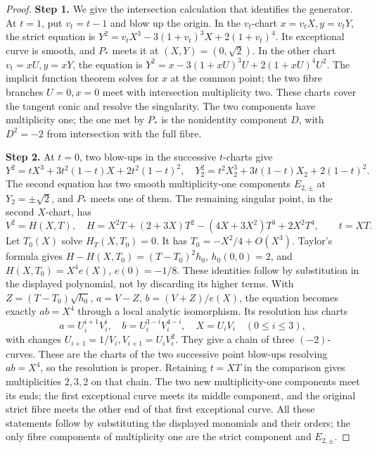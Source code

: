\begin{proof}
\par\smallskip\noindent\textbf{Step 1.} We give the intersection calculation that identifies the generator. At $t=1$, put $v_t=t-1$ and blow up the origin. In the $v_t$-chart $x=v_t X,y=v_t Y$, the strict equation is
$Y^2=v_t X^3-3(1+v_t)^3X+2(1+v_t)^4$. Its exceptional curve is smooth, and $P_*$ meets it at $(X,Y)=(0,\sqrt2)$. In the other chart $v_t=xU,y=xY$, the equation is $Y^2=x-3(1+xU)^3U+2(1+xU)^4U^2$. The implicit function theorem solves for $x$ at the common point; the two fibre branches $U=0,x=0$ meet with intersection multiplicity two. These charts cover the tangent conic and resolve the singularity. The two components have multiplicity one; the one met by $P_*$ is the nonidentity component $D$, with $D^2=-2$ from intersection with the full fibre.

\par\smallskip\noindent\textbf{Step 2.} At $t=0$, two blow-ups in the successive $t$-charts give
\[
 Y^2=tX^3+3t^2(1-t)X+2t^2(1-t)^2,
\quad
 Y_2^2=t^2X_2^3+3t(1-t)X_2+2(1-t)^2.
\]
The second equation has two smooth multiplicity-one components $E_{2,\pm}$ at $Y_2=\pm\sqrt2$, and $P_*$ meets one of them. The remaining singular point, in the second $X$-chart, has
\[
 V^2=H(X,T),\quad H=X^2T+(2+3X)T^2-(4X+3X^2)T^3+2X^2T^4,
 \qquad t=XT.
\]
Let $T_0(X)$ solve $H_T(X,T_0)=0$. It has $T_0=-X^2/4+O(X^3)$. Taylor's formula gives
$H-H(X,T_0)=(T-T_0)^2h_0$, $h_0(0,0)=2$, and $H(X,T_0)=X^4e(X)$, $e(0)=-1/8$. These identities follow by substitution in the displayed polynomial, not by discarding its higher terms. With $Z=(T-T_0)\sqrt{h_0}$, $a=V-Z$, $b=(V+Z)/e(X)$, the equation becomes exactly $ab=X^4$ through a local analytic isomorphism. Its resolution has charts
\[
 a=U_i^{i+1}V_i^i,\quad b=U_i^{3-i}V_i^{4-i},\quad X=U_iV_i
 \quad(0\le i\le3),
\]
with changes $U_{i+1}=1/V_i,V_{i+1}=U_iV_i^2$. They give a chain of three $(-2)$-curves. These are the charts of the two successive point blow-ups resolving $ab=X^4$, so the resolution is proper. Retaining $t=XT$ in the comparison gives multiplicities $2,3,2$ on that chain. The two new multiplicity-one components meet its ends; the first exceptional curve meets its middle component, and the original strict fibre meets the other end of that first exceptional curve. All these statements follow by substituting the displayed monomials and their orders; the only fibre components of multiplicity one are the strict component and $E_{2,\pm}$.


\end{proof}
